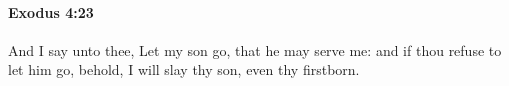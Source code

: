 			\begin{framed}
			\scriptsize
				\begin{compactdesc}
					\item[LXX]  \hyperref[PROTOTOKOS]{} 
				\end{compactdesc}
			\end{framed}

		\paragraph{Exodus 4:23} %
			\label{EXODUS-4-23}

			And I say unto thee, Let my son go, that he may serve me: and if thou refuse to let him go, behold, I will slay thy son, even thy firstborn.


